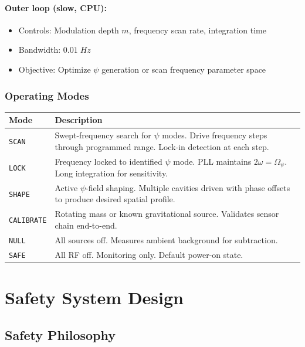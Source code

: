 \documentclass[11pt,a4paper]{article}
\begin{document}
\paragraph{Outer loop (slow, CPU):}
\begin{itemize}[nosep]
\item Controls: Modulation depth $m$, frequency scan rate,
integration time
\item Bandwidth: $0.01\;\si{Hz}$
\item Objective: Optimize $\psi$ generation or scan frequency
parameter space
\end{itemize}

\subsubsection{Operating Modes}

\begin{longtable}{p{}p{}}
\toprule
\textbf{Mode} & \textbf{Description} \\
\midrule
\endhead
\texttt{SCAN} & Swept-frequency search for $\psi$ modes.  Drive
frequency steps through programmed range.  Lock-in detection at
each step. \\
\texttt{LOCK} & Frequency locked to identified $\psi$ mode.  PLL
maintains $2\omega = \Omega_\psi$.  Long integration for
sensitivity. \\
\texttt{SHAPE} & Active $\psi$-field shaping.  Multiple cavities
driven with phase offsets to produce desired spatial profile. \\
\texttt{CALIBRATE} & Rotating mass or known gravitational source.
Validates sensor chain end-to-end. \\
\texttt{NULL} & All sources off.  Measures ambient background
for subtraction. \\
\texttt{SAFE} & All RF off.  Monitoring only.  Default power-on
state. \\
\bottomrule
\end{longtable}

\section{Safety System Design}

\subsection{Safety Philosophy}
\end{document}
